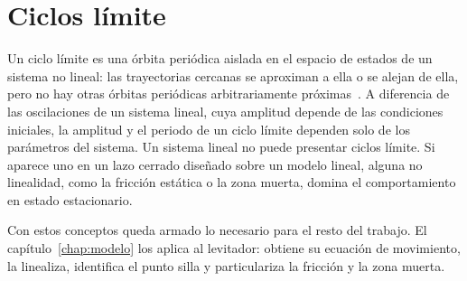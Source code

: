 \section{Ciclos límite}\label{sec:fund_ciclos}

Un ciclo límite es una órbita periódica aislada en el espacio de estados de un sistema no lineal: las trayectorias cercanas se aproximan a ella o se alejan de ella, pero no hay otras órbitas periódicas arbitrariamente próximas~\cite{khalil2,jean}. A diferencia de las oscilaciones de un sistema lineal, cuya amplitud depende de las condiciones iniciales, la amplitud y el periodo de un ciclo límite dependen solo de los parámetros del sistema. Un sistema lineal no puede presentar ciclos límite. Si aparece uno en un lazo cerrado diseñado sobre un modelo lineal, alguna no linealidad, como la fricción estática o la zona muerta, domina el comportamiento en estado estacionario.

Con estos conceptos queda armado lo necesario para el resto del trabajo. El capítulo~\ref{chap:modelo} los aplica al levitador: obtiene su ecuación de movimiento, la linealiza, identifica el punto silla y particulariza la fricción y la zona muerta.
